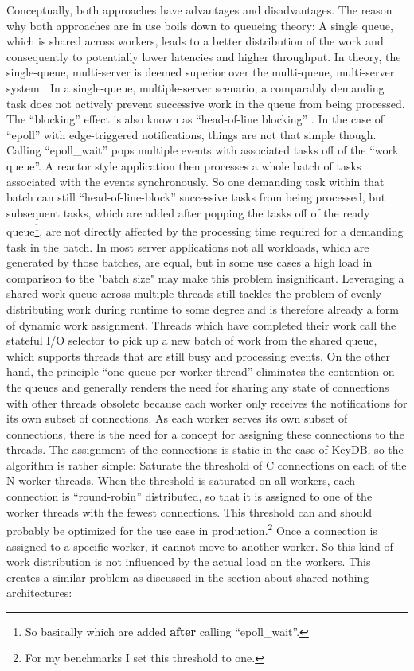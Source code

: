 Conceptually, both approaches have advantages and disadvantages. The reason why both approaches are in use boils down to queueing theory: A single queue, which is shared across workers, leads to a better distribution of the work and consequently to potentially lower latencies and higher throughput. In theory, the single-queue, multi-server is deemed superior over the multi-queue, multi-server system \cite{prasad:server}. In a single-queue, multiple-server scenario, a comparably demanding task does not actively prevent successive work in the queue from being processed. The “blocking” effect is also known as “head-of-line blocking” \cite[17-18]{kleppmann:data}. \newline
In the case of “epoll” with edge-triggered notifications, things are not that simple though. Calling “epoll\_wait” pops multiple events with associated tasks off of the “work queue”. A reactor style application then processes a whole batch of tasks associated with the events synchronously. So one demanding task within that batch can still “head-of-line-block” successive tasks from being processed, but subsequent tasks, which are added after popping the tasks off of the ready queue\footnote{So basically which are added \textbf{after} calling “epoll\_wait”.}, are not directly affected by the processing time required for a demanding task in the batch. In most server applications not all workloads, which are generated by those batches, are equal, but in some use cases a high load in comparison to the "batch size" may make this problem insignificant. \newline
Leveraging a shared work queue across multiple threads still tackles the problem of evenly distributing work during runtime to some degree and is therefore already a form of dynamic work assignment. Threads which have completed their work call the stateful I/O selector to pick up a new batch of work from the shared queue, which supports threads that are still busy and processing events. \newline
On the other hand, the principle “one queue per worker thread” eliminates the contention on the queues and generally renders the need for sharing any state of connections with other threads obsolete because each worker only receives the notifications for its own subset of connections. As each worker serves its own subset of connections, there is the need for a concept for assigning these connections to the threads. The assignment of the connections is static in the case of KeyDB, so the algorithm is rather simple: Saturate the threshold of C connections on each of the N worker threads. When the threshold is saturated on all workers, each connection is “round-robin” distributed, so that it is assigned to one of the worker threads with the fewest connections. This threshold can and should probably be optimized for the use case in production.\footnote{For my benchmarks I set this threshold to one.} Once a connection is assigned to a specific worker, it cannot move to another worker. So this kind of work distribution is not influenced by the actual load on the workers. This creates a similar problem as discussed in the section about shared-nothing architectures: \newline
